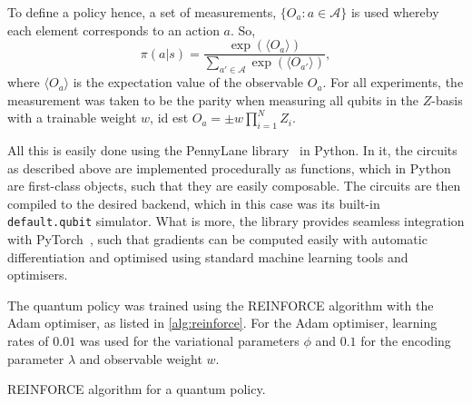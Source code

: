 To define a policy hence, a set of measurements, $\{O_a : a \in \mathcal{A}\}$ is used whereby each element corresponds to an action $a$.
So,
\begin{equation}
    \pi(a|s) = \frac{\exp\left(\langle O_a \rangle\right)}{\sum_{a' \in \mathcal{A}} \exp\left(\langle O_{a'} \rangle\right)},
\end{equation}
where $\langle O_a \rangle$ is the expectation value of the observable $O_a$.
For all experiments, the measurement was taken to be the parity when measuring all qubits in the $Z$-basis with a trainable weight $w$, id est $O_a = \pm w \prod_{i=1}^N Z_i$.

All this is easily done using the PennyLane library~\autocite{pennylane} in Python.
In it, the circuits as described above are implemented procedurally as functions, which in Python are first-class objects, such that they are easily composable.
The circuits are then compiled to the desired backend, which in this case was its built-in \texttt{default.qubit} simulator.
What is more, the library provides seamless integration with PyTorch~\autocite{pytorch}, such that gradients can be computed easily with automatic differentiation and optimised using standard machine learning tools and optimisers.

The quantum policy was trained using the REINFORCE algorithm with the Adam optimiser, as listed in \cref{alg:reinforce}.
For the Adam optimiser, learning rates of $0.01$ was used for the variational parameters $\phi$ and $0.1$ for the encoding parameter $\lambda$ and observable weight $w$.

\begin{algorithm}
    \SetAlgoLined
    \caption{REINFORCE algorithm for a quantum policy.}
    \label{alg:reinforce}
\end{algorithm}